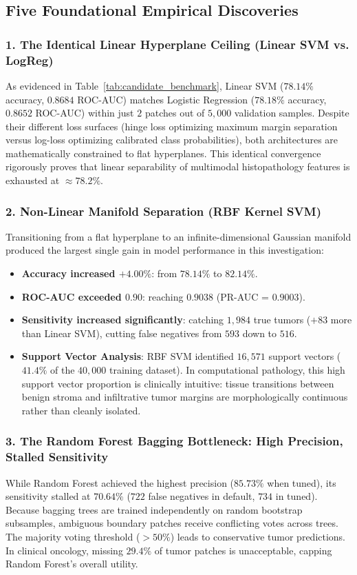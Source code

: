 \documentclass[11pt,a4paper]{article}
\begin{document}
\subsection{Five Foundational Empirical Discoveries}

\subsubsection{1. The Identical Linear Hyperplane Ceiling (Linear SVM vs. LogReg)}
As evidenced in Table~\ref{tab:candidate_benchmark}, Linear SVM ($78.14\%$ accuracy, $0.8684$ ROC-AUC) matches Logistic Regression ($78.18\%$ accuracy, $0.8652$ ROC-AUC) within just $2$ patches out of $5,000$ validation samples. Despite their different loss surfaces (hinge loss optimizing maximum margin separation versus log-loss optimizing calibrated class probabilities), both architectures are mathematically constrained to flat hyperplanes. This identical convergence rigorously proves that linear separability of multimodal histopathology features is exhausted at $\approx 78.2\%$.

\subsubsection{2. Non-Linear Manifold Separation (RBF Kernel SVM)}
Transitioning from a flat hyperplane to an infinite-dimensional Gaussian manifold produced the largest single gain in model performance in this investigation:
\begin{itemize}[noitemsep]
    \item \textbf{Accuracy increased $+4.00\%$}: from $78.14\%$ to $\mathbf{82.14\%}$.
    \item \textbf{ROC-AUC exceeded $0.90$}: reaching $\mathbf{0.9038}$ (PR-AUC = $0.9003$).
    \item \textbf{Sensitivity increased significantly}: catching $1,984$ true tumors ($+83$ more than Linear SVM), cutting false negatives from $593$ down to $516$.
    \item \textbf{Support Vector Analysis}: RBF SVM identified $16,571$ support vectors ($41.4\%$ of the $40,000$ training dataset). In computational pathology, this high support vector proportion is clinically intuitive: tissue transitions between benign stroma and infiltrative tumor margins are morphologically continuous rather than cleanly isolated.
\end{itemize}

\subsubsection{3. The Random Forest Bagging Bottleneck: High Precision, Stalled Sensitivity}
While Random Forest achieved the highest precision ($\mathbf{85.73\%}$ when tuned), its sensitivity stalled at $70.64\%$ ($722$ false negatives in default, $734$ in tuned). Because bagging trees are trained independently on random bootstrap subsamples, ambiguous boundary patches receive conflicting votes across trees. The majority voting threshold ($> 50\%$) leads to conservative tumor predictions. In clinical oncology, missing $29.4\%$ of tumor patches is unacceptable, capping Random Forest's overall utility.
\end{document}
